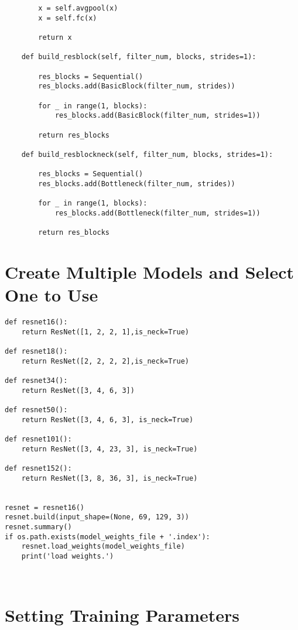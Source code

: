 \begin{verbatim}
        x = self.avgpool(x)
        x = self.fc(x)

        return x

    def build_resblock(self, filter_num, blocks, strides=1):

        res_blocks = Sequential()
        res_blocks.add(BasicBlock(filter_num, strides))

        for _ in range(1, blocks):
            res_blocks.add(BasicBlock(filter_num, strides=1))

        return res_blocks

    def build_resblockneck(self, filter_num, blocks, strides=1):

        res_blocks = Sequential()
        res_blocks.add(Bottleneck(filter_num, strides))

        for _ in range(1, blocks):
            res_blocks.add(Bottleneck(filter_num, strides=1))

        return res_blocks
\end{verbatim}



\section{Create Multiple Models and Select One to Use}


\begin{verbatim}
def resnet16():
    return ResNet([1, 2, 2, 1],is_neck=True)

def resnet18():
    return ResNet([2, 2, 2, 2],is_neck=True)

def resnet34():
    return ResNet([3, 4, 6, 3])

def resnet50():
    return ResNet([3, 4, 6, 3], is_neck=True)

def resnet101():
    return ResNet([3, 4, 23, 3], is_neck=True)

def resnet152():
    return ResNet([3, 8, 36, 3], is_neck=True)


resnet = resnet16()
resnet.build(input_shape=(None, 69, 129, 3))
resnet.summary()
if os.path.exists(model_weights_file + '.index'):
    resnet.load_weights(model_weights_file)
    print('load weights.')

    
\end{verbatim}


\section{Setting Training Parameters}

